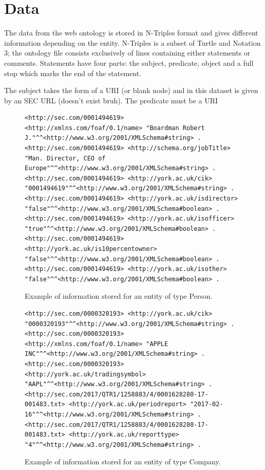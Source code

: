 \documentclass{UoYCSproject}
\begin{document}
\section{Data}

The data from the web ontology is stored in N-Triples format and gives different information depending on the entity. N-Triples is a subset of Turtle and Notation 3; the ontology file consists exclusively of lines containing either statements or comments. Statements have four parts: the subject, predicate, object and a full stop which marks the end of the statement.

The subject takes the form of a URI (or blank node) and in this dataset is given by an SEC URL (doesn't exist bruh). The predicate must be a URI

\begin{figure}[p]
\begin{lstlisting}[breaklines, basicstyle=\scriptsize, columns=fullflexible]
<http://sec.com/0001494619> <http://xmlns.com/foaf/0.1/name> "Boardman Robert J."^^<http://www.w3.org/2001/XMLSchema#string> .
<http://sec.com/0001494619> <http://schema.org/jobTitle> "Man. Director, CEO of Europe"^^<http://www.w3.org/2001/XMLSchema#string> .
<http://sec.com/0001494619> <http://york.ac.uk/cik> "0001494619"^^<http://www.w3.org/2001/XMLSchema#string> .
<http://sec.com/0001494619> <http://york.ac.uk/isdirector> "false"^^<http://www.w3.org/2001/XMLSchema#boolean> .
<http://sec.com/0001494619> <http://york.ac.uk/isofficer> "true"^^<http://www.w3.org/2001/XMLSchema#boolean> .
<http://sec.com/0001494619> <http://york.ac.uk/is10percentowner> "false"^^<http://www.w3.org/2001/XMLSchema#boolean> .
<http://sec.com/0001494619> <http://york.ac.uk/isother> "false"^^<http://www.w3.org/2001/XMLSchema#boolean> .
\end{lstlisting}
\caption{Example of information stored for an entity of type Person.}
\end{figure}

\begin{figure}[p]
\begin{lstlisting}[breaklines, basicstyle=\scriptsize, columns=fullflexible]
<http://sec.com/0000320193> <http://york.ac.uk/cik> "0000320193"^^<http://www.w3.org/2001/XMLSchema#string> .
<http://sec.com/0000320193> <http://xmlns.com/foaf/0.1/name> "APPLE INC"^^<http://www.w3.org/2001/XMLSchema#string> .
<http://sec.com/0000320193> <http://york.ac.uk/tradingsymbol> "AAPL"^^<http://www.w3.org/2001/XMLSchema#string> .
<http://sec.com/2017/QTR1/1258883/4/0001628280-17-001483.txt> <http://york.ac.uk/periodreport> "2017-02-16"^^<http://www.w3.org/2001/XMLSchema#string> .
<http://sec.com/2017/QTR1/1258883/4/0001628280-17-001483.txt> <http://york.ac.uk/reporttype> "4"^^<http://www.w3.org/2001/XMLSchema#string> .
\end{lstlisting}
\caption{Example of information stored for an entity of type Company.}
\end{figure}
\clearpage
\end{document}
